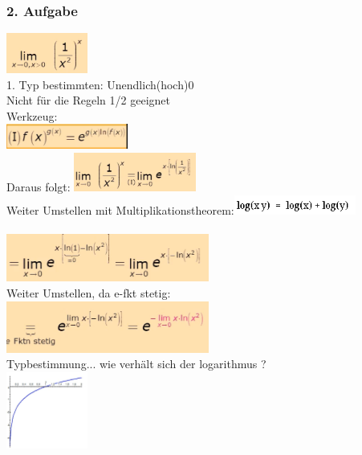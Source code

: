 \documentclass[12pt,a4paper]{article}
\begin{document}
\subsubsection{2. Aufgabe}
\includegraphics[width=0.2\textwidth]{BIlder/S1/7.png}\\
1. Typ bestimmten: Unendlich(hoch)0\\
Nicht für die Regeln 1/2 geeignet\\
Werkzeug:\\
\includegraphics[width=0.3\textwidth]{BIlder/S1/3.png}\\
Daraus folgt:
\includegraphics[width=0.3\textwidth]{BIlder/S1/8.png}\\
Weiter Umstellen mit Multiplikationstheorem:\includegraphics[width=0.3\textwidth]{BIlder/S1/10.png}\\\\
\includegraphics[width=0.5\textwidth]{BIlder/S1/9.png}\\
Weiter Umstellen, da e-fkt stetig:\\
\includegraphics[width=0.5\textwidth]{BIlder/S1/11.png}\\
Typbestimmung... wie verhält sich der logarithmus ?\\
\includegraphics[width=0.2\textwidth]{BIlder/S1/12.png}\\
\end{document}
